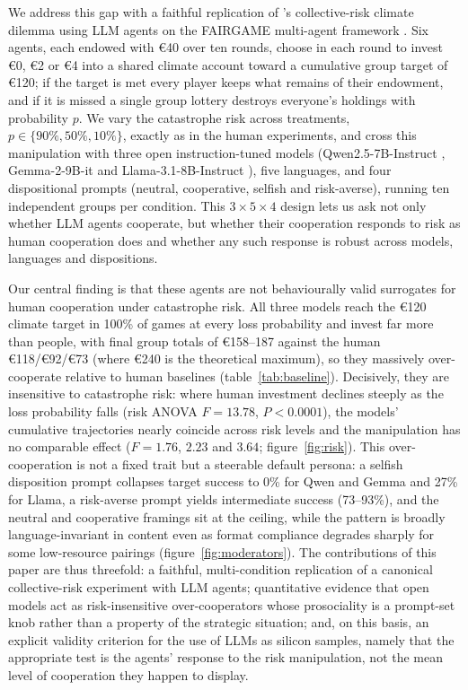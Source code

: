 \documentclass[openacc]{rsproca_new}
\begin{document}
We address this gap with a faithful replication of \textcite{milinski2008climate}'s collective-risk climate dilemma using LLM agents on the FAIRGAME multi-agent framework \cite{fairgame2025}. Six agents, each endowed with €40 over ten rounds, choose in each round to invest €0, €2 or €4 into a shared climate account toward a cumulative group target of €120; if the target is met every player keeps what remains of their endowment, and if it is missed a single group lottery destroys everyone's holdings with probability $p$. We vary the catastrophe risk across treatments, $p \in \{90\%, 50\%, 10\%\}$, exactly as in the human experiments, and cross this manipulation with three open instruction-tuned models (Qwen2.5-7B-Instruct \cite{qwen2025}, Gemma-2-9B-it \cite{gemma2024} and Llama-3.1-8B-Instruct \cite{llama2024}), five languages, and four dispositional prompts (neutral, cooperative, selfish and risk-averse), running ten independent groups per condition. This $3 \times 5 \times 4$ design lets us ask not only whether LLM agents cooperate, but whether their cooperation responds to risk as human cooperation does and whether any such response is robust across models, languages and dispositions.

Our central finding is that these agents are not behaviourally valid surrogates for human cooperation under catastrophe risk. All three models reach the €120 climate target in 100\% of games at every loss probability and invest far more than people, with final group totals of €158--187 against the human €118/€92/€73 (where €240 is the theoretical maximum), so they massively over-cooperate relative to human baselines (table~\ref{tab:baseline}). Decisively, they are insensitive to catastrophe risk: where human investment declines steeply as the loss probability falls (risk ANOVA $F = 13.78$, $P < 0.0001$), the models' cumulative trajectories nearly coincide across risk levels and the manipulation has no comparable effect ($F = 1.76$, $2.23$ and $3.64$; figure~\ref{fig:risk}). This over-cooperation is not a fixed trait but a steerable default persona: a selfish disposition prompt collapses target success to 0\% for Qwen and Gemma and 27\% for Llama, a risk-averse prompt yields intermediate success (73--93\%), and the neutral and cooperative framings sit at the ceiling, while the pattern is broadly language-invariant in content even as format compliance degrades sharply for some low-resource pairings (figure~\ref{fig:moderators}). The contributions of this paper are thus threefold: a faithful, multi-condition replication of a canonical collective-risk experiment with LLM agents; quantitative evidence that open models act as risk-insensitive over-cooperators whose prosociality is a prompt-set knob rather than a property of the strategic situation; and, on this basis, an explicit validity criterion for the use of LLMs as silicon samples, namely that the appropriate test is the agents' response to the risk manipulation, not the mean level of cooperation they happen to display.
\end{document}
